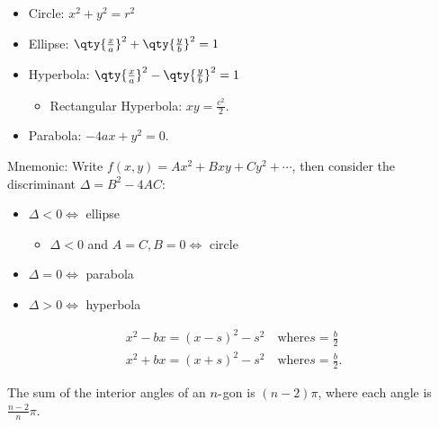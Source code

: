\begin{fact}

\envlist

\begin{itemize}
\tightlist
\item
  Circle: \(x^2 + y^2 = r^2\)
\item
  Ellipse: \(\qty{\frac x a}^2 + \qty{\frac y b}^2 = 1\)
\item
  Hyperbola: \(\qty{\frac x a}^2 - \qty{\frac y b}^2 = 1\)

  \begin{itemize}
  \tightlist
  \item
    Rectangular Hyperbola: \(xy = \frac{c^2}{2}\).
  \end{itemize}
\item
  Parabola: \(-4ax + y^2 = 0\).
\end{itemize}

Mnemonic: Write \(f(x, y) = Ax^2 + Bxy + Cy^2 + \cdots\), then consider
the discriminant \(\Delta = B^2 - 4AC\):

\begin{itemize}
\tightlist
\item
  \(\Delta < 0 \iff\) ellipse

  \begin{itemize}
  \tightlist
  \item
    \(\Delta < 0\) and \(A=C, B=0 \iff\) circle
  \end{itemize}
\item
  \(\Delta = 0 \iff\) parabola
\item
  \(\Delta > 0 \iff\) hyperbola
\end{itemize}

\end{fact}

\begin{fact}

\begin{align*}
x^2 - bx = (x - s)^2 - s^2 \quad\text{where} s = \frac{b}{2} \\
x^2 + bx = (x + s)^2 - s^2 \quad\text{where} s = \frac{b}{2}
.\end{align*}

\end{fact}

\begin{fact}

The sum of the interior angles of an \(n{\hbox{-}}\)gon is \((n-2)\pi\),
where each angle is \(\frac{n-2}{n}\pi\).

\end{fact}


